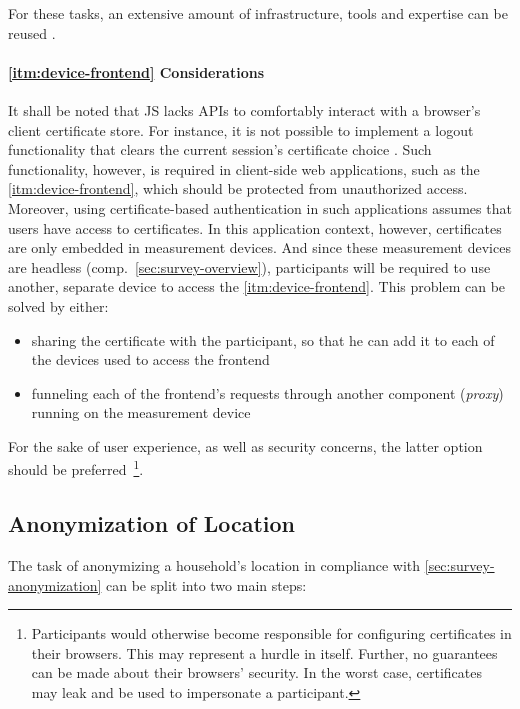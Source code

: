 For these tasks, an extensive amount of infrastructure, tools and expertise can be reused \cite[p.~37]{hummen2013towards}.


\paragraph{\ref*{itm:device-frontend} Considerations}
It shall be noted that \acl*{JS} lacks \acsp{API} to comfortably interact with a browser's client certificate store. For instance, it is not possible to implement a logout functionality that clears the current session's certificate choice \cite[p.~8]{parsovs2013practical}. Such functionality, however, is required in client-side web applications, such as the \ref{itm:device-frontend}, which should be protected from unauthorized access. Moreover, using certificate-based authentication in such applications assumes that users have access to certificates. In this application context, however, certificates are only embedded in measurement devices. And since these measurement devices are headless (comp.~\autoref{sec:survey-overview}), participants will be required to use another, separate device to access the \ref{itm:device-frontend}. This problem can be solved by either:

\begin{itemize}
  \item sharing the certificate with the participant, so that he can add it to each of the devices used to access the frontend
  \item funneling each of the frontend's requests through another component (\textit{proxy}) running on the measurement device
\end{itemize}

For the sake of user experience, as well as security concerns, the latter option should be preferred~\footnote{Participants would otherwise become responsible for configuring certificates in their browsers. This may represent a hurdle in itself. Further, no guarantees can be made about their browsers' security. In the worst case, certificates may leak and be used to impersonate a participant.}.


\subsection{Anonymization of Location}
\label{sec:anonymization-of-location-realization}

The task of anonymizing a household's location in compliance with \autoref{sec:survey-anonymization} can be split into two main steps:

